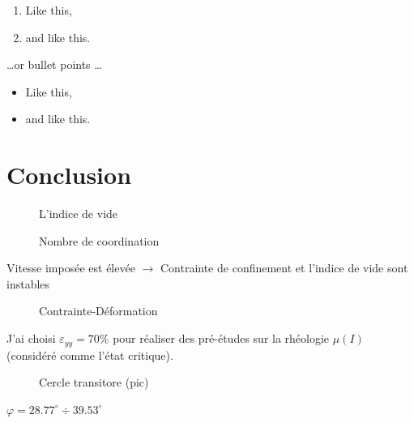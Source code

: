 \documentclass[a4paper,12pt]{report}
\begin{document}
\begin{enumerate}
\item Like this,
\item and like this.
\end{enumerate}
\dots or bullet points \dots
\begin{itemize}
\item Like this,
\item and like this.
\end{itemize}
\chapter{Conclusion}

                                \begin{figure}
                                  \small
                                  
                                    \caption{L'indice de vide}
                                \end{figure}
                                    
                                \begin{figure}
                                   
                                    \caption{Nombre de coordination}
                                \end{figure}

                                Vitesse imposée est élevée $\rightarrow$ Contrainte de confinement et l'indice de vide sont instables

     
                                \begin{figure}
                                    
                                    \caption{Contrainte-Déformation}
                                \end{figure}
                                J'ai choisi $\varepsilon_{yy} = 70\%$ pour réaliser des pré-études sur la rhéologie $\mu(I)$ (considéré comme l'état critique). 


                                \begin{figure}
                                  
                                    \caption{Cercle transitore (pic)}
                                \end{figure}

                                    $\varphi = 28.77^\circ \div 39.53^\circ $
\end{document}
